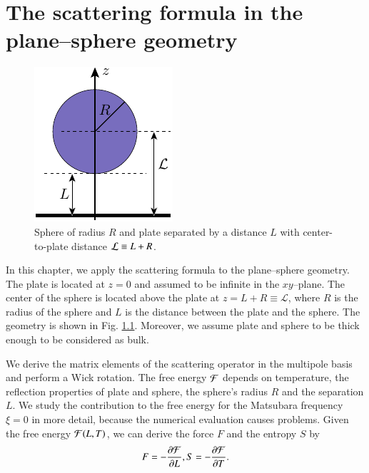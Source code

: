 \chapter{The scattering formula in the plane--sphere geometry}
\label{chapter_scattering_ps}

\begin{figure}
\begin{center}
\includegraphics[scale=1.5]{images/geometry.pdf}
\end{center}
\caption{Sphere of radius $R$ and plate separated by a distance $L$ with
center-to-plate distance $\mathcal{L} \equiv L+R$.}
\label{fig:4_geometry}
\end{figure}

In this chapter, we apply the scattering formula to the plane--sphere geometry.
The plate is located at $z=0$ and assumed to be infinite in the $xy$--plane.
The center of the sphere is located above the plate at $z= L+R \equiv
\mathcal{L}$, where $R$ is the radius of the sphere and $L$ is the distance
between the plate and the sphere. The geometry is shown in
Fig. \ref{fig:4_geometry}. Moreover, we assume plate and sphere to be thick
enough to be considered as bulk.

We derive the matrix elements of the scattering operator in the multipole basis
and perform a Wick rotation. The free energy $\mathcal{F}$ depends on temperature, the
reflection properties of plate and sphere, the sphere's radius $R$ and the
separation $L$. We study the contribution to the free energy for the Matsubara
frequency $\xi=0$ in more detail, because the numerical evaluation causes
problems. Given the free energy $\mathcal{F}(L,T)$, we can derive the force $F$ and the
entropy $S$ by
\begin{equation}
F = - \frac{\partial \mathcal{F}}{\partial L}, \\ S = - \frac{\partial \mathcal{F}}{\partial T}.
\end{equation}


